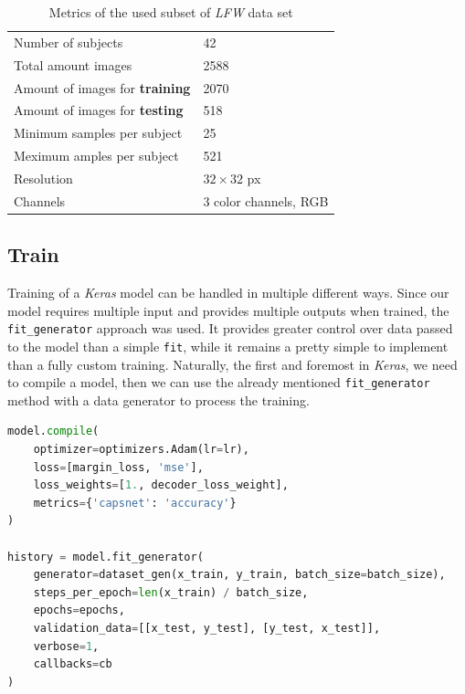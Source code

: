 \begin{table}[ht]
    \centering
    \begin{tabularx}{.8\textwidth}{l|X}
        \toprule
        Number of subjects & \num{42} \\
        Total amount images & \num{2588} \\
        Amount of images for \textbf{training} & \num{2070} \\
        Amount of images for \textbf{testing} & \num{518} \\
        Minimum samples per subject & \num{25} \\
        Meximum amples per subject & \num{521} \\
        Resolution & $32\times32$ px \\
        Channels & 3 color channels, RGB \\
        \bottomrule
    \end{tabularx}
    \caption{Metrics of the used subset of \textit{LFW} data set}
\end{table}

\subsection{Train}

Training of a \textit{Keras} model can be handled in multiple different ways. Since our model requires multiple input and provides multiple outputs when trained, the \texttt{fit\_generator} approach was used. It provides greater control over data passed to the model than a simple \texttt{fit}, while it remains a pretty simple to implement than a fully custom training. Naturally, the first and foremost in \textit{Keras}, we need to compile a model, then we can use the already mentioned \texttt{fit\_generator} method with a data generator to process the training.


\begin{lstlisting}[language=Python, caption=Training a \textit{Keras} mode using \texttt{fit\_generator}]
model.compile(
    optimizer=optimizers.Adam(lr=lr),
    loss=[margin_loss, 'mse'],
    loss_weights=[1., decoder_loss_weight],
    metrics={'capsnet': 'accuracy'}
)

history = model.fit_generator(
    generator=dataset_gen(x_train, y_train, batch_size=batch_size),
    steps_per_epoch=len(x_train) / batch_size,
    epochs=epochs,
    validation_data=[[x_test, y_test], [y_test, x_test]],
    verbose=1,
    callbacks=cb
)
\end{lstlisting}

